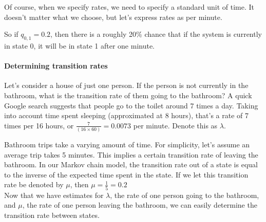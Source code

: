 Of course, when we specify rates, we need to specify a standard unit of time. It doesn't matter what we choose, but let's express rates as per minute. 

So if $q_{0, 1} = 0.2$, then there is a roughly 20\% chance that if the system is currently in state 0, it will be in state 1 after one minute.

\paragraph{Determining transition rates}
Let's consider a house of just one person. If the person is not currently in the bathroom, what is the transition rate of them going to the bathroom? A quick Google search suggests that people go to the toilet around 7 times a day. Taking into account time spent sleeping (approximated at 8 hours), that's a rate of 7 times per 16 hours, or $\frac{7}{(16 \times 60)} = 0.0073$ per minute. Denote this as $\lambda$.

Bathroom trips take a varying amount of time. For simplicity, let's assume an average trip takes 5 minutes. This implies a certain transition rate of leaving the bathroom. In our Markov chain model, the transition rate out of a state is equal to the inverse of the expected time spent in the state. If we let this transition rate be denoted by $\mu$, then $\mu = \frac{1}{5} = 0.2 $
\\

Now that we have estimates for $\lambda$, the rate of one person going to the bathroom, and $\mu$, the rate of one person leaving the bathroom, we can easily determine the transition rate between states. 

